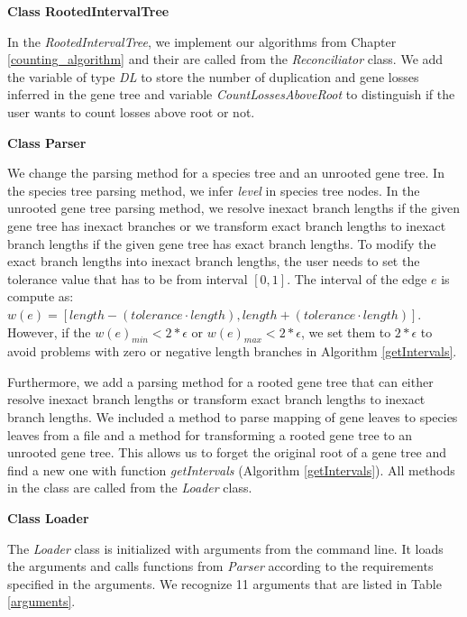 \noindent \textbf{Class RootedIntervalTree}

In the \emph{RootedIntervalTree}, we implement our algorithms from Chapter \ref{counting_algorithm} and their are called from the \emph{Reconciliator} class. We add the variable of type \emph{DL} to store the number of duplication and gene losses inferred in the gene tree and variable \emph{CountLossesAboveRoot} to distinguish if the user wants to count losses above root or not.

\noindent \textbf{Class Parser}

We change the parsing method for a species tree and an unrooted gene tree. In the species tree parsing method, we infer \emph{level} in species tree nodes. In the unrooted gene tree parsing method, we resolve inexact branch lengths if the given gene tree has inexact branches or we transform exact branch lengths to inexact branch lengths if the given gene tree has exact branch lengths. To modify the exact branch lengths into inexact branch lengths, the user needs to set the tolerance value that has to be from interval $[ 0, 1 ]$. The interval of the edge $e$ is compute as: $w(e) = [ length - (tolerance \cdot length), length + (tolerance \cdot length) ]$. However, if the $w(e)_{min} < 2*\epsilon$ or $w(e)_{max} < 2*\epsilon$, we set them to $2*\epsilon$ to avoid problems with zero or negative length branches in Algorithm \ref{getIntervals}. 

Furthermore, we add a parsing method for a rooted gene tree that can either resolve inexact branch lengths or transform exact branch lengths to inexact branch lengths. We included a method to parse mapping of gene leaves to species leaves from a file and a method for transforming a rooted gene tree to an unrooted gene tree. This allows us to forget the original root of a gene tree and find a new one with function \emph{getIntervals} (Algorithm \ref{getIntervals}). All methods in the class are called from the \emph{Loader} class.

\noindent \textbf{Class Loader}

The \emph{Loader} class is initialized with arguments from the command line. It loads the arguments and calls functions from \emph{Parser} according to the requirements specified in the arguments. We recognize 11 arguments that are listed in Table \ref{arguments}.

